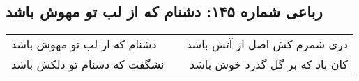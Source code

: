 \begin{center}
\section*{رباعی شماره ۱۴۵: دشنام که از لب تو مهوش باشد}
\label{sec:sh145}
\begin{longtable}{l p{0.5cm} r}
دشنام که از لب تو مهوش باشد
&&
دری شمرم کش اصل از آتش باشد
\\
نشگفت که دشنام تو دلکش باشد
&&
کان باد که بر گل گذرد خوش باشد
\\
\end{longtable}
\end{center}
